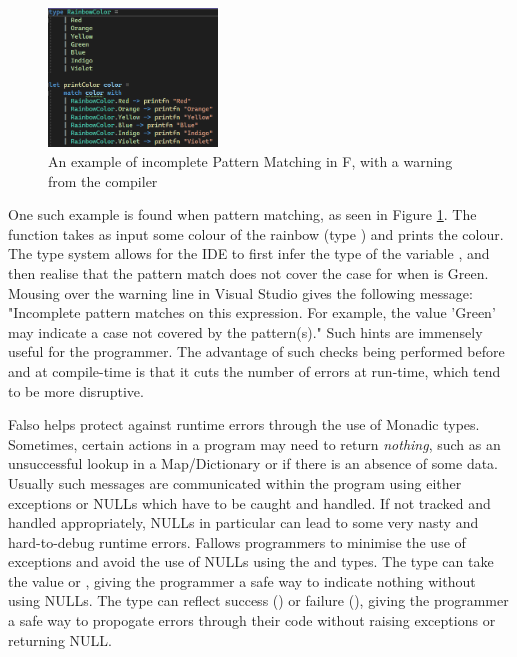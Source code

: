 \begin{figure} 
  \begin{center}
    \includegraphics[width=0.40\textwidth]{02.Background/patternmatch.png}
  \end{center}
  \caption{An example of incomplete Pattern Matching in F\fsharp, with a warning from the compiler}
  \label{fig:patternmatch}
\end{figure}

One such example is found when pattern matching, as seen in Figure \ref{fig:patternmatch}. The function  takes as input some colour of the rainbow (type ) and prints the colour. The type system allows for the IDE to first infer the type of the variable , and then realise that the pattern match does not cover the case for when  is Green. Mousing over the warning line in Visual Studio gives the following message: "Incomplete pattern matches on this expression. For example, the value 'Green' may indicate a case not covered by the pattern(s)." Such hints are immensely useful for the programmer. The advantage of such checks being performed before and at compile-time is that it cuts the number of errors at run-time, which tend to be more disruptive.

F\fsharp also helps protect against runtime errors through the use of Monadic types. Sometimes, certain actions in a program may need to return \textit{nothing}, such as an unsuccessful lookup in a Map/Dictionary or if there is an absence of some data. Usually such messages are communicated within the program using either exceptions or NULLs which have to be caught and handled. If not tracked and handled appropriately, NULLs in particular can lead to some very nasty and hard-to-debug runtime errors. F\fsharp allows programmers to minimise the use of exceptions and avoid the use of NULLs using the  and  types. The  type can take the value  or , giving the programmer a safe way to indicate nothing without using NULLs. The  type can reflect success () or failure (), giving the programmer a safe way to propogate errors through their code without raising exceptions or returning NULL. 

